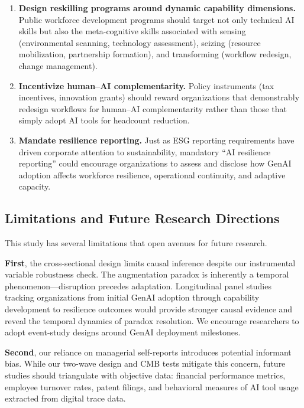 \documentclass[12pt, a4paper]{article}
\begin{document}
\begin{enumerate}[nosep]
    \item \textbf{Design reskilling programs around dynamic capability dimensions.} Public workforce development programs should target not only technical AI skills but also the meta-cognitive skills associated with sensing (environmental scanning, technology assessment), seizing (resource mobilization, partnership formation), and transforming (workflow redesign, change management).

    \item \textbf{Incentivize human--AI complementarity.} Policy instruments (tax incentives, innovation grants) should reward organizations that demonstrably redesign workflows for human--AI complementarity rather than those that simply adopt AI tools for headcount reduction.

    \item \textbf{Mandate resilience reporting.} Just as ESG reporting requirements have driven corporate attention to sustainability, mandatory ``AI resilience reporting'' could encourage organizations to assess and disclose how GenAI adoption affects workforce resilience, operational continuity, and adaptive capacity.
\end{enumerate}

\subsection{Limitations and Future Research Directions}

This study has several limitations that open avenues for future research.

\textbf{First}, the cross-sectional design limits causal inference despite our instrumental variable robustness check. The augmentation paradox is inherently a temporal phenomenon---disruption precedes adaptation. Longitudinal panel studies tracking organizations from initial GenAI adoption through capability development to resilience outcomes would provide stronger causal evidence and reveal the temporal dynamics of paradox resolution. We encourage researchers to adopt event-study designs around GenAI deployment milestones.

\textbf{Second}, our reliance on managerial self-reports introduces potential informant bias. While our two-wave design and CMB tests mitigate this concern, future studies should triangulate with objective data: financial performance metrics, employee turnover rates, patent filings, and behavioral measures of AI tool usage extracted from digital trace data.
\end{document}
